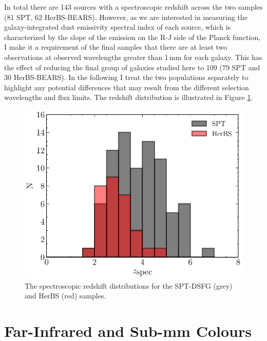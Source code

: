 In total there are 143 sources with a spectroscopic redshift across the two samples (81 SPT, 62 HerBS-BEARS). However, as we are interested in measuring the galaxy-integrated dust emissivity spectral index of each source, which is characterized by the slope of the emission on the R-J side of the Planck function, I make it a requirement of the final samples that there are at least two observations at observed wavelengths greater than 1\,mm for each galaxy. This has the effect of reducing the final group of galaxies studied here to 109 (79 SPT and 30 HerBS-BEARS). In the following I treat the two populations separately to highlight any potential differences that may result from the different selection wavelengths and flux limits. The redshift distribution is illustrated in Figure \ref{fig:spt_herbs_redshift}.

\begin{figure}
	\includegraphics[width=\columnwidth]{Figures/spt_herbs_redshift_distribution.pdf}
	\caption{The spectroscopic redshift distributions for the SPT-DSFG (grey) and HerBS (red) samples.}
	\label{fig:spt_herbs_redshift}
\end{figure}

\section{Far-Infrared and Sub-mm Colours}

